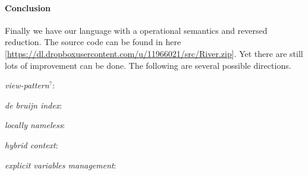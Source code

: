 \documentclass[a4paper]{article}
\begin{document}
\paragraph{Conclusion} Finally we have our language with a operational semantics and reversed reduction. The source code can be found in here [\url{https://dl.dropboxusercontent.com/u/11966021/src/River.zip}]. Yet there are still lots of improvement can be done. The following are several possible directions.
\begin{inlinelist}
\item \textit{view-pattern$^{?}$}:
\item \textit{de bruijn index}:
\item \textit{locally nameless}:
\item \textit{hybrid context}:
\item \textit{explicit variables management}:
\end{inlinelist}


\inputminted{haskell}{../haskell/Expr.hs}



\end{document}
